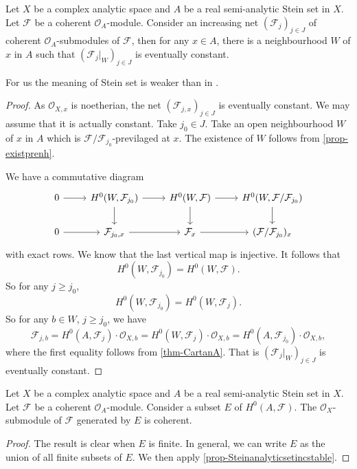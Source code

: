 \begin{proposition}\label{prop-Steinanalyticsetincstable}
    Let $X$ be a complex analytic space and $A$ be a real semi-analytic Stein set in $X$. Let $\mathcal{F}$ be a coherent $\mathcal{O}_A$-module. Consider an increasing net $(\mathcal{F}_j)_{j\in J}$ of coherent $\mathcal{O}_A$-submodules of $\mathcal{F}$, then for any $x\in A$, there is a neighbourhood $W$ of $x$ in $A$ such that $(\mathcal{F}_j|_W)_{j\in J}$ is eventually constant.
\end{proposition}
For us the meaning of Stein set is weaker than in \cite{Fri67}.
\begin{proof}
    As $\mathcal{O}_{X,x}$ is noetherian, the net $(\mathcal{F}_{j,x})_{j\in J}$ is eventually constant. We may assume that it is actually constant. Take $j_0\in J$. Take an open neighbourhood $W$ of $x$ in $A$ which is $\mathcal{F}/\mathcal{F}_{j_0}$-previlaged at $x$. The existence of $W$ follows from \cref{prop-existprenh}.

    We have a commutative diagram
    \[
        \begin{tikzcd}
            0 \arrow[r] & {H^0(W,\mathcal{F}_{j_0})} \arrow[r] \arrow[d] & {H^0(W,\mathcal{F})} \arrow[r] \arrow[d] & {H^0(W,\mathcal{F}/\mathcal{F}_{j_0})} \arrow[d] \\
            0 \arrow[r] & {\mathcal{F}_{j_0,x}} \arrow[r]                & \mathcal{F}_{x} \arrow[r]                & (\mathcal{F}/\mathcal{F}_{j_0})_{x}             
            \end{tikzcd}    
    \]
    with exact rows. We know that the last vertical map is injective. It follows that 
    \[
        H^0(W,\mathcal{F}_{j_0})=H^0(W,\mathcal{F}).
    \]
    So for any $j\geq j_0$,
    \[
        H^0(W,\mathcal{F}_{j_0})=H^0(W,\mathcal{F}_j).
    \]
    So for any $b\in W$, $j\geq j_0$, we have
    \[
        \mathcal{F}_{j,b}=H^0(A,\mathcal{F}_j)\cdot \mathcal{O}_{X,b}=H^0(W,\mathcal{F}_j)\cdot \mathcal{O}_{X,b}=H^0(A,\mathcal{F}_{j_0})\cdot \mathcal{O}_{X,b},
    \]
    where the first equality follows from \cref{thm-CartanA}. That is $(\mathcal{F}_j|_W)_{j\in J}$ is eventually constant.
\end{proof}

\begin{corollary}\label{cor-sheafgeneratedbyseconsascoherent}
    Let $X$ be a complex analytic space and $A$ be a real semi-analytic Stein set in $X$. Let $\mathcal{F}$ be a coherent $\mathcal{O}_A$-module. Consider a subset $E$ of $H^0(A,\mathcal{F})$. The $\mathcal{O}_X$-submodule of $\mathcal{F}$ generated by $E$ is coherent.
\end{corollary}
\begin{proof}
    The result is clear when $E$ is finite. In general, we can write $E$ as the union of all finite subsets of $E$. We then apply \cref{prop-Steinanalyticsetincstable}.
\end{proof}

